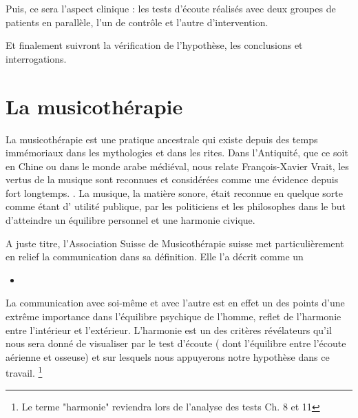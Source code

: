 Puis, ce sera l'aspect clinique : les tests d'écoute réalisés  avec deux groupes 
de patients en parallèle, l'un de contrôle et l'autre d'intervention.

Et finalement suivront la vérification de l'hypothèse, les conclusions et 
interrogations. 


	


\chapter{La musicothérapie}

La musicothérapie est une pratique ancestrale qui existe depuis des
temps immémoriaux dans les mythologies et dans les rites. Dans l'Antiquité, que ce soit en Chine ou dans le monde arabe 
médiéval, nous relate François-Xavier Vrait,  	 
les vertus de la musique sont reconnues et considérées comme une évidence depuis 
fort longtemps. 
  \autocite[ch. III, p. 
96]{vrait_musicotherapie_2018}.
La musique, la matière sonore, était  reconnue en quelque sorte comme étant d' utilité
publique, 
par les  politiciens  et les philosophes dans le but d'atteindre un
équilibre personnel et une harmonie civique.
 	 
A juste titre, l'Association Suisse de Musicothérapie suisse met particulièrement en relief 
la communication dans sa définition. Elle l'a décrit comme un 
 
\begin{itemize}
\item {}
\end{itemize}

La communication avec soi-même et avec l'autre est en effet un des
points 
d'une extrême importance dans l'équilibre psychique de l'homme, reflet
de 
l'harmonie entre l'intérieur et l'extérieur. L'harmonie est un des  
critères révélateurs qu'il nous sera donné de visualiser par le test
d'écoute ( dont l'équilibre entre l'écoute aérienne et osseuse) et sur
lesquels 
nous appuyerons notre hypothèse  
dans ce travail.  \footnote{Le terme "harmonie" reviendra lors de
  l'analyse des tests Ch. 8 et 11}


